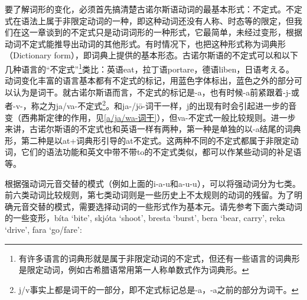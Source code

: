 要了解词形的变化，必须首先搞清楚古诺尔斯语动词的最基本形式：不定式。不定式在语法上属于非限定动词的一种，即这种动词还没有人称、时态等的限定，但我们在这一章谈到的不定式只是动词词形的一种形式，它最简单，未经过变形，根据动词不定式能推导出动词的其他形式。有时情况下，也把这种形式称为词典形（Dictionary
form），即词典上提供的基本形态。古诺尔斯语的不定式可以和以下几种语言的``不定式''\footnote{有许多语言的词典形就是属于非限定动词的不定式，但还有一些语言的词典形是限定动词，例如古希腊语常用第一人称单数式作为词典形。}类比：英语eat，拉丁语portare，德语liben，日语考える。动词变化丰富的语言基本都有不定式的标记，用蓝色字体标出，蓝色之外的部分可以认为是词干。就古诺尔斯语而言，不定式的标记是-a，也有时候-a前紧跟着-j-或者-v-，称之为ja/va-不定式\footnote{j/v事实上都是词干的一部分，即不定式标记总是-a，-a之前的部分为词干。}。和ja-/jō-词干一样，j的出现有时会引起进一步的音变（西弗斯定律的作用，见\ref{a/ja/wa-词干}），但va-不定式一般比较规则。进一步来讲，古诺尔斯语的不定式也和英语一样有两种，第一种是单独的以-a结尾的词典形，第二种是以at+词典形引导的at不定式。这两种不同的不定式都属于非限定动词，它们的语法功能和英文中带不带to的不定式类似，都可以作某些动词的补足语等。

根据强动词元音交替的模式（例如上面的i-a-u和a-u-u），可以将强动词分为七类。前六类动词比较规则，第七类动词则是一些历史上不太规则的动词的残留。为了明确元音交替的模式，需要选择动词的一些形式作为基本元。请先参考下面六类动词的一些变形，bíta
`bite', skjóta `shoot', bresta `burst', bera `bear, carry', reka
`drive‌', fara `go/fare‌':

